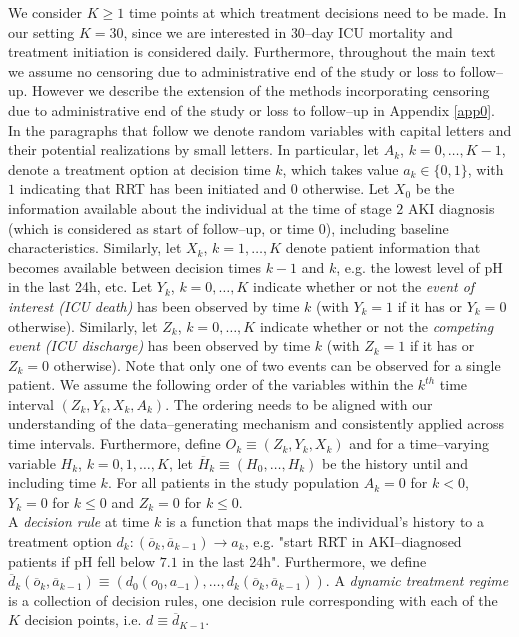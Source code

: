 \documentclass[12pt]{article}
\begin{document}
We consider $K \geq 1$ time points at which treatment decisions need to be made. In our setting $K = 30$, since we are interested in $30$--day ICU mortality and treatment initiation is considered daily. Furthermore, throughout the main text we assume no censoring due to administrative end of the study or loss to follow--up. However we describe the extension of the methods incorporating censoring due to administrative end of the study or loss to follow--up in Appendix \ref{app0}. In the paragraphs that follow we denote random variables with capital letters and their potential realizations by small letters. In particular, let $A_k$, $k=0,\dots, K-1$, denote a treatment option at decision time $k$, which takes value $a_k \in \{0,1\}$, with $1$ indicating that RRT has been initiated and $0$ otherwise. Let $X_0$ be the information available about the individual at the time of stage $2$ AKI diagnosis (which is considered as start of follow--up, or time $0$), including baseline characteristics. Similarly, let $X_k$, $k=1,\dots,K$ denote patient information that becomes available between decision times $k-1$ and $k$, e.g. the lowest level of pH in the last 24h, etc. Let $Y_k$, $k=0,\dots,K$ indicate whether or not the \emph{event of interest (ICU death)} has been observed by time $k$ (with $Y_k = 1$ if it has or $Y_k = 0$ otherwise). Similarly, let $Z_k$, $k=0,\dots,K$ indicate whether or not the \emph{competing event (ICU discharge)} has been observed by time $k$ (with $Z_k = 1$ if it has or $Z_k = 0$ otherwise). Note that only one of two events can be observed for a single patient. We assume the following order of the variables within the $k^{th}$ time interval $\left( Z_k, Y_k, X_k, A_k \right)$. The ordering needs to be aligned with our understanding of the data--generating mechanism and consistently applied across time intervals. Furthermore, define $O_k \equiv \left( Z_k, Y_k, X_k \right)$ and for a time--varying variable $H_k$, $k = 0, 1, \dots, K$, let $\overline{H}_k \equiv \left( H_0, \dots, H_k \right)$ be the history until and including time $k$.  For all patients in the study population $A_k = 0$ for $k < 0$, $Y_k = 0$ for $k \leq 0$ and $Z_k = 0$ for $k \leq 0$. 
\\
\indent
A \emph{decision rule} at time $k$ is a function that maps the individual's history to a treatment option $d_k \colon \left( \overline{o}_k, \overline{a}_{k-1} \right) \rightarrow a_k$, e.g. "start RRT in AKI--diagnosed patients if pH fell below $7.1$ in the last 24h". Furthermore, we define $\overline{d}_k \left( \overline{o}_k, \overline{a}_{k-1} \right) \equiv \left( d_0 \left( o_0, a_{-1} \right), \dots, d_k \left( \overline{o}_k, \overline{a}_{k-1} \right)\right)$. A \emph{dynamic treatment regime} is a collection of decision rules, one decision rule corresponding with each of the $K$ decision points, i.e. $d \equiv \overline{d}_{K-1}$. 
\end{document}
